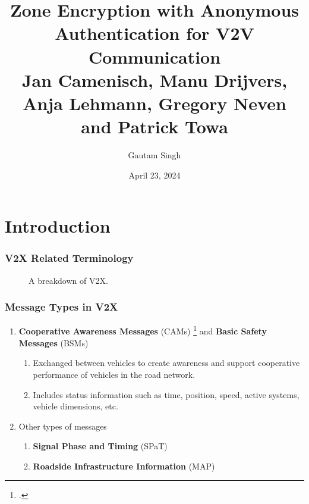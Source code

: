 \documentclass{beamer}
\title[Zone Encryption]{Zone Encryption with Anonymous Authentication for V2V
Communication \\
\small Jan Camenisch, Manu Drijvers, Anja Lehmann, Gregory Neven and Patrick
Towa}
\date{April 23, 2024}
\author{Gautam Singh}
\institute[IITH]{Indian Institute of Technology Hyderabad}
\begin{document}
    \maketitle
    \tableofcontents
    \section{Introduction}
    
    \begin{frame}
        \frametitle{V2X Related Terminology}
        \begin{figure}
            \centering
            \resizebox{.8\textwidth}{!}{}
            \caption{A breakdown of V2X.}
        \end{figure}
    \end{frame}

    \begin{frame}
        \frametitle{Message Types in V2X}
        \begin{enumerate}
            \item \textbf{Cooperative Awareness Messages} (CAMs)
            \footcite{etsi-en-302-637} and \textbf{Basic Safety Messages} (BSMs)
            \begin{enumerate}
                \item Exchanged between vehicles to create awareness and support
                cooperative performance of vehicles in the road network.
                \item Includes status information such as time, position, speed,
                active systems, vehicle dimensions, etc.
            \end{enumerate}
            \pause
            \item Other types of messages
            \begin{enumerate}
                \item \textbf{Signal Phase and Timing} (SPaT)
                \item \textbf{Roadside Infrastructure Information} (MAP)
            \end{enumerate} 
        \end{enumerate}
    \end{frame}
\end{document}
